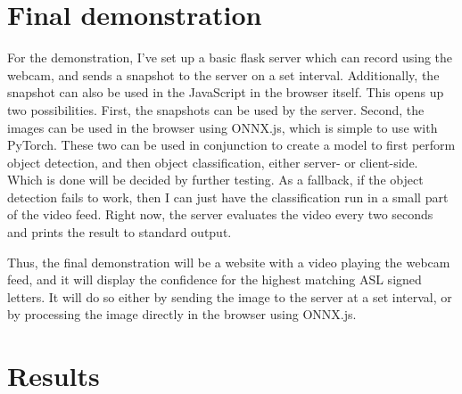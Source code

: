 \documentclass[12pt]{article}
\begin{document}
\section{Final demonstration}

For the demonstration, I've set up a basic flask server which can record
using the webcam, and sends a snapshot to the server on a set interval.
Additionally, the snapshot can also be used in the JavaScript in the
browser itself. This opens up two possibilities. First, the snapshots
can be used by the server.  Second, the images can be used in the
browser using ONNX.js\cite{onnxjs}, which is simple to use with PyTorch.
These two can be used in conjunction to create a model to first perform
object detection, and then object classification, either server- or
client-side. Which is done will be decided by further testing. As a
fallback, if the object detection fails to work, then I can just have
the classification run in a small part of the video feed.  Right now,
the server evaluates the video every two seconds and prints the result
to standard output.

Thus, the final demonstration will be a website with a video playing the
webcam feed, and it will display the confidence for the highest matching
ASL signed letters. It will do so either by sending the image to the
server at a set interval, or by processing the image directly in the
browser using ONNX.js\cite{onnxjs}.

\section{Results}
\end{document}
